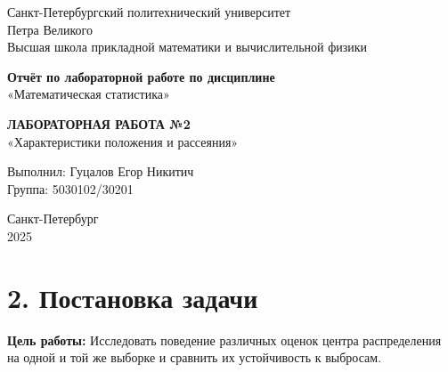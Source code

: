 \documentclass[a4paper,14pt]{extarticle}
\begin{document}
\begin{titlepage}
\begin{center}
\large
Санкт-Петербургский политехнический университет \\
Петра Великого \\
Высшая школа прикладной математики и вычислительной физики \\
\vspace{3cm}

\textbf{Отчёт по лабораторной работе по дисциплине} \\
«Математическая статистика» \\
\vspace{0.5cm}

\textbf{ЛАБОРАТОРНАЯ РАБОТА №2} \\
«Характеристики положения и рассеяния» \\
\vspace{2cm}

Выполнил: Гуцалов Егор Никитич \\
Группа: 5030102/30201 \\
\vfill

Санкт-Петербург \\
2025
\end{center}
\end{titlepage}

\section*{2. Постановка задачи}

\textbf{Цель работы:} Исследовать поведение различных оценок центра распределения на одной и той же выборке и сравнить их устойчивость к выбросам.
\end{document}
